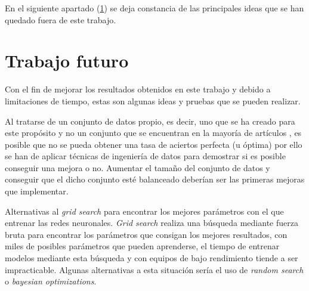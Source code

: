 En el siguiente apartado (\ref{sec:trabajo-futuro}) se deja constancia de las principales ideas que se han quedado fuera de este trabajo.





%
%
%
%

\section{Trabajo futuro}
\label{sec:trabajo-futuro}

Con el fin de mejorar los resultados obtenidos en este trabajo y debido a limitaciones de tiempo, estas son algunas ideas y pruebas que se pueden realizar.

Al tratarse de un conjunto de datos propio, es decir, uno que se ha creado para este propósito y no un conjunto que se encuentran en la mayoría de artículos \cite{krizhevsky2009learning, lecun1998mnist, netzer2011reading}, es posible que no se pueda obtener una tasa de aciertos perfecta (u óptima) por ello se han de aplicar técnicas de ingeniería de datos para demostrar si es posible conseguir una mejora o no. Aumentar el tamaño del conjunto de datos y conseguir que el dicho conjunto esté balanceado deberían ser las primeras mejoras que implementar.


Alternativas al \textit{grid search} para encontrar los mejores parámetros con el que entrenar las redes neuronales.
\textit{Grid search} realiza una búsqueda mediante fuerza bruta para encontrar los parámetros que consigan los 
mejores resultados, con miles de posibles parámetros que pueden aprenderse, el tiempo de entrenar modelos mediante 
esta búsqueda y con equipos de bajo rendimiento tiende a ser impracticable. Algunas alternativas a esta situación 
sería el uso de \textit{random search} o \textit{bayesian optimizations}.



